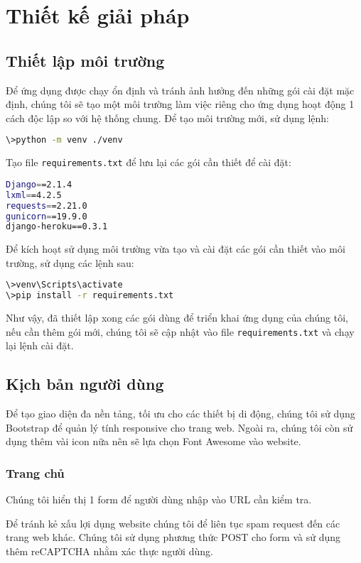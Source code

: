 \chapter{Thiết kế giải pháp}
\section{Thiết lập môi trường}
Để ứng dụng được chạy ổn định và tránh ảnh hưởng đến những gói cài đặt mặc định, chúng tôi sẽ tạo một môi trường làm việc riêng cho ứng dụng hoạt động 1 cách độc lập so với hệ thống chung. Để tạo môi trường mới, sử dụng lệnh:
\begin{lstlisting}[language=bash]
\>python -m venv ./venv
\end{lstlisting}
\par
Tạo file \texttt{requirements.txt} để lưu lại các gói cần thiết để cài đặt:
\begin{lstlisting}[language=bash]
Django==2.1.4
lxml==4.2.5
requests==2.21.0
gunicorn==19.9.0
django-heroku==0.3.1
\end{lstlisting}
\par
Để kích hoạt sử dụng môi trường vừa tạo và cài đặt các gói cần thiết vào môi trường, sử dụng các lệnh sau:
\begin{lstlisting}[language=bash]
\>venv\Scripts\activate
\>pip install -r requirements.txt
\end{lstlisting}
\par
Như vậy, đã thiết lập xong các gói dùng để triển khai ứng dụng của chúng tôi, nếu cần thêm gói mới, chúng tôi sẽ cập nhật vào file \texttt{requirements.txt} và chạy lại lệnh cài đặt.
\section{Kịch bản người dùng}
Để tạo giao diện đa nền tảng, tối ưu cho các thiết bị di động, chúng tôi sử dụng Bootstrap để quản lý tính responsive cho trang web. Ngoài ra, chúng tôi còn sử dụng thêm vài icon nữa nên sẽ lựa chọn Font Awesome vào website.
\subsection{Trang chủ}
Chúng tôi hiển thị 1 form để người dùng nhập vào URL cần kiểm tra.
\par
Để tránh kẻ xấu lợi dụng website chúng tôi để liên tục spam request đến các trang web khác. Chúng tôi sử dụng phương thức POST cho form và sử dụng thêm reCAPTCHA nhằm xác thực người dùng.
